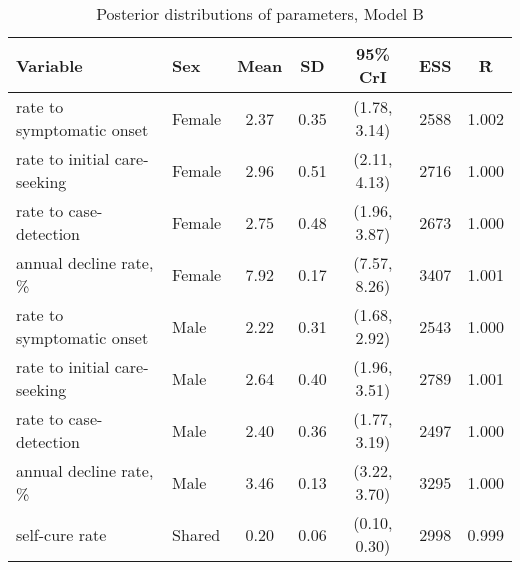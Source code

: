 \begin{table}[h]

\caption{\label{tab:}Posterior distributions of parameters, Model B}
\centering
\begin{tabular}[t]{llccccc}
\toprule
Variable & Sex & Mean & SD & 95\% CrI & ESS & \^{R}\\
\midrule
rate to symptomatic onset & Female & 2.37 & 0.35 & (1.78, 3.14) & 2588 & 1.002\\
rate to initial care-seeking & Female & 2.96 & 0.51 & (2.11, 4.13) & 2716 & 1.000\\
rate to case-detection & Female & 2.75 & 0.48 & (1.96, 3.87) & 2673 & 1.000\\
annual decline rate, \% & Female & 7.92 & 0.17 & (7.57, 8.26) & 3407 & 1.001\\
\addlinespace
rate to symptomatic onset & Male & 2.22 & 0.31 & (1.68, 2.92) & 2543 & 1.000\\
rate to initial care-seeking & Male & 2.64 & 0.40 & (1.96, 3.51) & 2789 & 1.001\\
rate to case-detection & Male & 2.40 & 0.36 & (1.77, 3.19) & 2497 & 1.000\\
annual decline rate, \% & Male & 3.46 & 0.13 & (3.22, 3.70) & 3295 & 1.000\\
\addlinespace
self-cure rate & Shared & 0.20 & 0.06 & (0.10, 0.30) & 2998 & 0.999\\
\bottomrule
\end{tabular}
\end{table}
